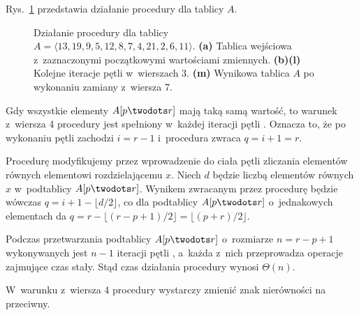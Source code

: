 
\exercise %

\noindent Rys.\ \ref{fig:7.1-1} przedstawia działanie procedury  dla tablicy $A$.
\begin{figure}[!ht]
	\centering 
	\caption{Działanie procedury  dla tablicy $A=\langle13,19,9,5,12,8,7,4,21,2,6,11\rangle$.
{\sffamily\bfseries(a)} Tablica wejściowa z~zaznaczonymi początkowymi wartościami zmiennych.
{\sffamily\bfseries(b)\nbendash(l)} Kolejne iteracje pętli  w~wierszach 3.
{\sffamily\bfseries(m)} Wynikowa tablica $A$ po wykonaniu zamiany z~wiersza 7.} \label{fig:7.1-1}
\end{figure}

\exercise %

\noindent Gdy wszystkie elementy $A[p\twodots r]$ mają taką samą wartość, to warunek z~wiersza 4 procedury  jest spełniony w~każdej iteracji pętli .
Oznacza to, że po wykonaniu pętli zachodzi $i=r-1$ i~procedura zwraca $q=i+1=r$.

Procedurę modyfikujemy przez wprowadzenie do ciała pętli  zliczania elementów równych elementowi rozdzielającemu $x$.
Niech $d$ będzie liczbą elementów równych $x$ w~podtablicy $A[p\twodots r]$.
Wynikem zwracanym przez procedurę będzie wówczas $q=i+1-\lfloor d/2\rfloor$, co dla podtablicy $A[p\twodots r]$ o~jednakowych elementach da $q=r-\lfloor(r-p+1)/2\rfloor=\lfloor(p+r)/2\rfloor$.

\exercise %
Podczas przetwarzania podtablicy $A[p\twodots r]$ o~rozmiarze $n=r-p+1$ wykonywanych jest $n-1$ iteracji pętli , a~każda z~nich przeprowadza operacje zajmujące czas stały.
Stąd czas działania procedury  wynosi $\Theta(n)$.

\exercise %
W~warunku z~wiersza 4 procedury  wystarczy zmienić znak nierówności na przeciwny.
